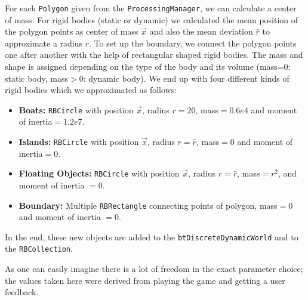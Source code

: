 For each \texttt{Polygon} given from the \texttt{ProcessingManager}, we can calculate a center of mass. For rigid bodies (static or dynamic) we calculated the mean position of the polygon points as center of mass $\vec{x}$ and also the mean deviation $\hat{r}$ to approximate a radius $r$. To set up the boundary, we connect the polygon points one after another with the help of rectangular shaped rigid bodies. The mass and shape is assigned depending on the type of the body and its volume (mass=0: static body, mass$>$0: dynamic body). We end up with four different kinds of rigid bodies which we approximated as follows:
\begin{itemize}
\item \textbf{Boats:} \texttt{RBCircle} with position $\vec{x}$, radius $r=20$, mass$=0.6e4$ and moment of inertia$=1.2e7$.
\item \textbf{Islands:} \texttt{RBCircle} with position $\vec{x}$, radius $r=\hat{r}$, mass$=0$ and moment of inertia$=0$.
\item \textbf{Floating Objects:} \texttt{RBCircle} with position $\vec{x}$, radius $r=\hat{r}$, mass$=r^2$, and moment of inertia $=0$.
\item \textbf{Boundary:} Multiple \texttt{RBRectangle} connecting points of polygon, mass$=0$ and moment of inertia $=0$.
\end{itemize}
In the end, these new objects are added to the \texttt{btDiscreteDynamicWorld} and to the \texttt{RBCollection}.


As one can easily imagine there is a lot of freedom in the exact parameter choice; the values taken here were derived from playing the game and getting a user feedback.

